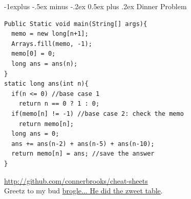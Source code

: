\documentclass[10pt,landscape]{article}
\makeatletter
\renewcommand{\subsection}{\@startsection{subsection}{2}{0mm}%
                                {-1explus -.5ex minus -.2ex}%
                                {0.5ex plus .2ex}%
                                {\normalfont\normalsize\bfseries}}
\makeatother
\begin{document}
\begin{multicols}{3}
\subsection{Dinner Problem}
\begin{lstlisting}
Public Static void main(String[] args){
  memo = new long[n+1];
  Arrays.fill(memo, -1);
  memo[0] = 0;
  long ans = ans(n);
}
static long ans(int n){
  if(n <= 0) //base case 1
    return n == 0 ? 1 : 0;
  if(memo[n] != -1) //base case 2: check the memo
    return memo[n];
  long ans = 0;
  ans += ans(n-2) + ans(n-5) + ans(n-10);
  return memo[n] = ans; //save the answer
}
\end{lstlisting}
\vspace{5pt}
\href{http://github.com/connerbrooks/cheat-sheets}{http://github.com/connerbrooks/cheat-sheets}\\
Greetz to my bud \href{http://github.com/broglea}{brogle... He did the zweet table}.

\end{multicols}
\end{document}
